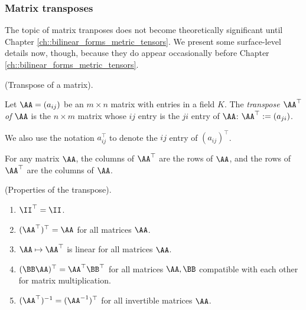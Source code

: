 \subsubsection{Matrix transposes}

The topic of matrix tranposes does not become theoretically significant until Chapter \ref{ch::bilinear_forms_metric_tensors}. We present some surface-level details now, though, because they do appear occasionally before Chapter \ref{ch::bilinear_forms_metric_tensors}.

\begin{defn}
    (Transpose of a matrix).

    Let $\AA = (a_{ij})$ be an $m \times n$ matrix with entries in a field $K$. The \textit{transpose $\AA^\top$ of $\AA$} is the $n \times m$ matrix whose $ij$ entry is the $ji$ entry of $\AA$: $\AA^\top := (a_{ji})$. 
    
    We also use the notation $a_{ij}^\top$ to denote the $ij$ entry of $(a_{ij})^\top$.

    For any matrix $\AA$, the columns of $\AA^\top$ are the rows of $\AA$, and the rows of $\AA^\top$ are the columns of $\AA$.
\end{defn}

\begin{theorem}
    (Properties of the transpose).

    \begin{enumerate}
        \item $\II^\top = \II$.
        \item $(\AA^\top)^\top = \AA$ for all matrices $\AA$.
        \item $\AA \mapsto \AA^\top$ is linear for all matrices $\AA$.
        \item $(\BB \AA)^\top = \AA^\top \BB^\top$ for all matrices $\AA, \BB$ compatible with each other for matrix multiplication.
        \item $(\AA^{\top})^{-1} = (\AA^{-1})^\top$ for all invertible matrices $\AA$.
    \end{enumerate}
\end{theorem}

